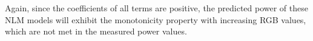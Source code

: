 {Again, since the coefficients of all terms are positive,}
the predicted power of these NLM models will exhibit the monotonicity property
with increasing RGB values, which are not met in the measured power values.
\fi

% 
